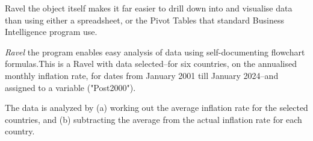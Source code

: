 Ravel the object itself makes it far easier to drill down into and
visualise data than using either a spreadsheet, or the Pivot Tables
that standard Business Intelligence program use.

\emph{Ravel} the program enables easy analysis of data using self-documenting
flowchart formulas.This is a Ravel with data selected--for six countries,
on the annualised monthly inflation rate, for dates from January 2001
till January 2024--and assigned to a variable ("Post2000").
\noindent \begin{flushleft}
\par\end{flushleft}

The data is analyzed by (a) working out the average inflation rate
for the selected countries, and (b) subtracting the average from the
actual inflation rate for each country.

